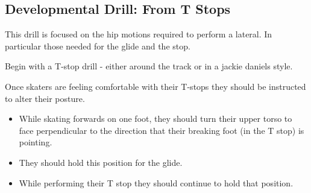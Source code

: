 \subsection*{Developmental Drill: From T Stops}
\label{drill:laterals/developmental/t_stop}

This drill is focused on the hip motions required to perform a lateral.
In particular those needed for the glide and the stop.    


Begin with a T-stop drill - either around the track or in a jackie daniels style.

Once skaters are feeling comfortable with their T-stops they should be instructed to alter their posture.  

\begin{itemize}
\item While skating forwards on one foot, they should turn their upper torso to face perpendicular to the direction that their breaking foot (in the T stop) is pointing. 
\item They should hold this position for the glide.
\item While performing their T stop they should continue to hold that position.
\end{itemize}


